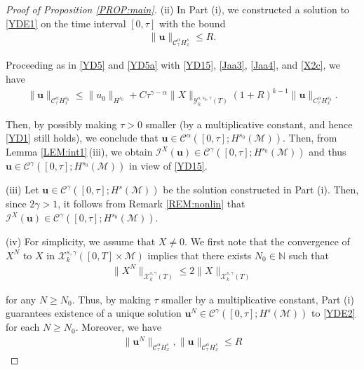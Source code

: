 \documentclass[letterpaper, 11pt,  reqno]{amsart}
\newcommand{\1}{\hspace{0.5mm}\text{I}\hspace{0.5mm}}
\newcommand{\I}{\mathcal{I}}
\newcommand{\noi}{\noindent}
\newcommand{\CC}{\mathcal{C}}
\newcommand{\al}{\alpha}
\newcommand{\g}{\gamma}
\newcommand{\M}{\mathcal{M}}
\newcommand{\N}{\mathbb{N}}
\newcommand{\cC}{\mathcal{C}}
\newcommand{\cX}{\mathcal{X}}
\newcommand{\cY}{\mathcal{Y}}
\newcommand{\uu}{\mathbf{u}}
\numberwithin{equation}{section}
\numberwithin{theorem}{section}
\begin{document}
\begin{proof}[Proof of Proposition \ref{PROP:main}]
\medskip

\noi
(ii)
In Part (i), we constructed a solution to \eqref{YDE1}
on the time interval $[0, \tau]$ with the bound 
\begin{align*}
\| \uu\|_{\CC^\al_\tau H^s_x} \le R.
\end{align*}

\noi
Proceeding as in \eqref{YD5}  and \eqref{YD5a} with 
\eqref{YD15}, 
\eqref{Jaa3},  \eqref{Jaa4}, 
and \eqref{X2c}, 
we have
\begin{align*}
\| \uu\|_{\CC^\al_\tau H^{s_0}_x} \le  \|u_0\|_{H^{s_0}} 
+ C \tau^{\g- \al}
\|X\|_{\cY^{s, s_0, \g}_k(T)}
(1+ R)^{k-1} \| \uu\|_{C^\al_\tau H^{s_0}_x}.
\end{align*}

\noi
Then, by possibly making $\tau > 0$ smaller (by a multiplicative constant, and hence \eqref{YD1}
still holds), 
we conclude that 
$\uu \in  \CC^\al([0, \tau]; H^{s_0}(\M))$.
Then, from 
Lemma \ref{LEM:int1}\,(iii), 
we obtain 
 $\I^X(\uu) \in 
 \CC^\g([0, \tau]; H^{s_0}(\M))$
 and thus
  $\uu \in 
 \CC^\g([0, \tau]; H^{s_0}(\M))$
 in view of \eqref{YD15}.





\medskip

\noi
(iii)
Let   $\uu \in \cC^\g([0, \tau]; H^s(\M))$ be the solution constructed in Part (i).
Then, since $2\g > 1$, 
it follows from 
Remark \ref{REM:nonlin}
that 
 $\I^X(\uu) \in \cC^\g([0, \tau]; H^{s_0}(\M))$.





\medskip

\noi
(iv)
For simplicity, we assume that $X\ne 0$.
We first note that the convergence of $X^N$ to $X$ in 
$ \cX^{s, \g}_k([0, T]\times \M)$ implies
that there exists $N_0 \in \N$ such that 
\begin{align}\|X^N\|_{\cX^{s, \g}_k(T)} \le
2 \|X\|_{\cX^{s, \g}_k(T)} 
\label{YDE3a}
\end{align}

\noi
for any $N \ge N_0$.
Thus, by making $\tau$ smaller by a multiplicative constant, 
Part (i) guarantees existence of 
a unique solution $\uu^N \in \CC^\g([0, \tau]; H^s(\M))$
to \eqref{YDE2} for each $N \ge N_0$.
Moreover, we have 
\begin{align}
\|\uu^N \|_{\CC^\al_\tau H^s_x} , \|\uu \|_{\CC^\al_\tau H^s_x} \le R
\label{YDE3b}
\end{align}


\end{proof}
\end{document}
